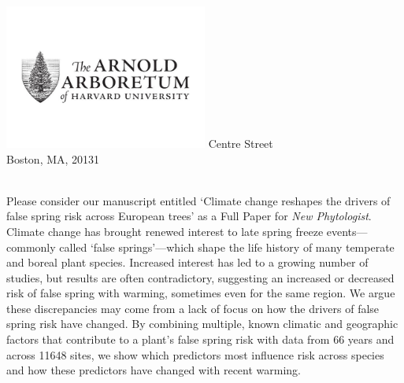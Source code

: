 \documentclass[11pt,a4paper]{article}\usepackage[]{graphicx}\usepackage[]{color}
\begin{document}
\includegraphics[width=0.5\textwidth, right]{AA_logo.jpg}
 Centre Street\\
\noindent Boston, MA, 20131\\


\vspace{1.5ex}




\vspace{3ex}\\
\noindent Please consider our manuscript entitled `Climate change reshapes the drivers of false spring risk across European trees' as a Full Paper for \textit{New Phytologist}. Climate change has brought renewed interest to late spring freeze events---commonly called `false springs'---which shape the life history of many temperate and boreal plant species. Increased interest has led to a growing number of studies, but results are often contradictory, suggesting an increased or decreased risk of false spring with warming, sometimes even for the same region. We argue these discrepancies may come from a lack of focus on how the drivers of false spring risk have changed. By combining multiple, known climatic and geographic factors that contribute to a plant's false spring risk with data from 66 years and across 11648 sites, we show which predictors most influence risk across species and how these predictors have changed with recent warming.  \\
\end{document}
